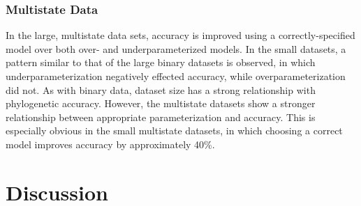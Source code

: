 \documentclass[]{article}
\begin{document}
\subsubsection{Multistate Data}

In the large, multistate data sets, accuracy is improved using a correctly-specified model over both over- and underparameterized models. 
In the small datasets, a pattern similar to that of the large binary datasets is observed, in which underparameterization negatively effected accuracy, while overparameterization did not. 
As with binary data, dataset size has a strong relationship with phylogenetic accuracy. 
However, the multistate datasets show a stronger relationship between appropriate parameterization and accuracy. 
This is especially obvious in the small multistate datasets, in which choosing a correct model improves accuracy by approximately 40\%. \par

\section{Discussion}	
\end{document}
